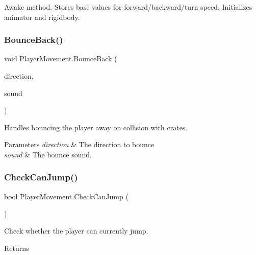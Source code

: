 Awake method. Stores base values for forward/backward/turn speed. Initializes animator and rigidbody. 

\mbox{\label{class_player_movement_afb1de7cf992b55d0dc16fa0f39cec433}} 
\subsubsection{\texorpdfstring{Bounce\+Back()}{BounceBack()}}
{\footnotesize\ttfamily void Player\+Movement.\+Bounce\+Back (\begin{DoxyParamCaption}\item[{Vector3}]{direction,  }\item[{Audio\+Clip}]{sound }\end{DoxyParamCaption})}



Handles bouncing the player away on collision with crates. 


\begin{DoxyParams}{Parameters}
{\em direction} & The direction to bounce\\
\hline
{\em sound} & The bounce sound.\\
\hline
\end{DoxyParams}
\mbox{\label{class_player_movement_a14c78137af78e9cc16246804a42b90a7}} 
\subsubsection{\texorpdfstring{Check\+Can\+Jump()}{CheckCanJump()}}
{\footnotesize\ttfamily bool Player\+Movement.\+Check\+Can\+Jump (\begin{DoxyParamCaption}{ }\end{DoxyParamCaption})}



Check whether the player can currently jump. 

\begin{DoxyReturn}{Returns}

\end{DoxyReturn}
\mbox{\label{class_player_movement_aff95a78e48e00b3196b7ec14c77539e2}} 
